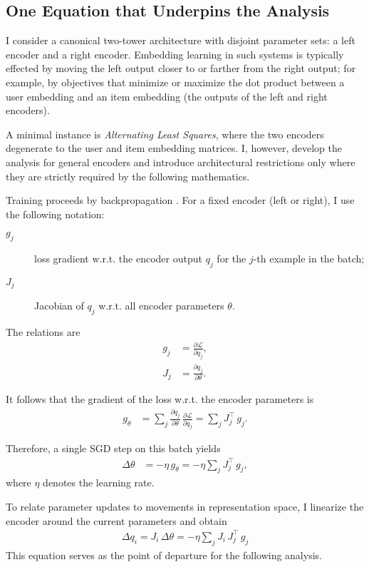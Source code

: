 \subsection{One Equation that Underpins the Analysis}

I consider a canonical two-tower architecture with disjoint parameter sets: a left encoder and a right encoder. Embedding learning in such systems is typically effected by moving the left output closer to or farther from the right output; for example, by objectives that minimize or maximize the dot product between a user embedding and an item embedding (the outputs of the left and right encoders).

A minimal instance is \emph{Alternating Least Squares}, where the two encoders degenerate to the user and item embedding matrices. I, however, develop the analysis for general encoders and introduce architectural restrictions only where they are strictly required by the following mathematics.

Training proceeds by backpropagation \cite{goodfellow2016deeplearning}. For a fixed encoder (left or right), I use the following notation:

\begin{description}
\item[$g_j$] loss gradient w.r.t. the encoder output $q_j$ for the $j$-th example in the batch;
\item[$J_j$] Jacobian of $q_j$ w.r.t. all encoder parameters $\theta$.
\end{description}

The relations are
\begin{align}
g_j &= \frac{\partial \mathcal{L}}{\partial q_j},\\
J_j &= \frac{\partial q_j}{\partial \theta}.
\end{align}

It follows that the gradient of the loss w.r.t. the encoder parameters is
\begin{align}
g_{\theta} &= \sum_{j} \frac{\partial q_j}{\partial \theta}\, \frac{\partial \mathcal{L}}{\partial q_j}
= \sum_{j} J_{j}^{\!\top}\, g_{j}.
\end{align}

Therefore, a single SGD step on this batch yields
\begin{align}
\Delta \theta &= -\eta\,g_{\theta}
= -\eta \sum_{j} J_{j}^{\!\top}\, g_{j},
\end{align}
where $\eta$ denotes the learning rate.

To relate parameter updates to movements in representation space, I linearize the encoder around the current parameters and obtain
\begin{align}
\boxed{\; \Delta q_{i} = J_{i}\,\Delta\theta = -\eta \sum_{j} J_{i}\,J_{j}^{\!\top}\,g_{j} \;}\label{eq:starting-formula}
\end{align}
This equation serves as the point of departure for the following analysis.
